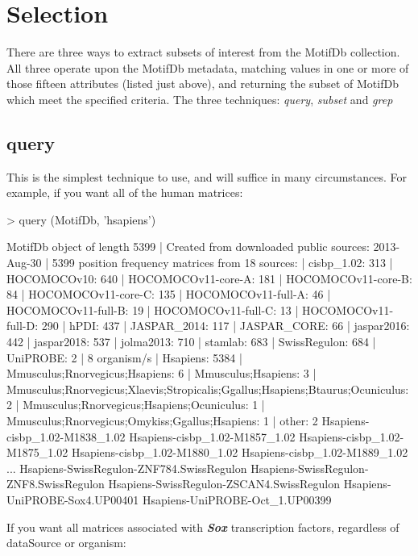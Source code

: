 \documentclass{article}
\renewenvironment{Schunk}{\vspace{\topsep}}{\vspace{\topsep}}
\begin{document}
\section{Selection}

There are three ways to extract subsets of interest from the MotifDb collection.  All three operate upon the MotifDb metadata,
matching values in one or more of those fifteen attributes (listed just above), and returning the subset of MotifDb  which
meet the specified criteria.  The three techniques:  \emph{query}, \emph{subset} and \emph{grep}

\subsection{query}
This is the simplest technique to use, and will suffice in many circumstances.  For example, if you want
all of the human matrices:
\begin{Schunk}
\begin{Sinput}
> query (MotifDb, 'hsapiens')
\end{Sinput}
\begin{Soutput}
MotifDb object of length 5399
| Created from downloaded public sources: 2013-Aug-30
| 5399 position frequency matrices from 18 sources:
|         cisbp_1.02:  313
|        HOCOMOCOv10:  640
| HOCOMOCOv11-core-A:  181
| HOCOMOCOv11-core-B:   84
| HOCOMOCOv11-core-C:  135
| HOCOMOCOv11-full-A:   46
| HOCOMOCOv11-full-B:   19
| HOCOMOCOv11-full-C:   13
| HOCOMOCOv11-full-D:  290
|               hPDI:  437
|        JASPAR_2014:  117
|        JASPAR_CORE:   66
|         jaspar2016:  442
|         jaspar2018:  537
|          jolma2013:  710
|            stamlab:  683
|       SwissRegulon:  684
|           UniPROBE:    2
| 8 organism/s
|           Hsapiens: 5384
| Mmusculus;Rnorvegicus;Hsapiens:    6
| Mmusculus;Hsapiens:    3
| Mmusculus;Rnorvegicus;Xlaevis;Stropicalis;Ggallus;Hsapiens;Btaurus;Ocuniculus:    2
| Mmusculus;Rnorvegicus;Hsapiens;Ocuniculus:    1
| Mmusculus;Rnorvegicus;Omykiss;Ggallus;Hsapiens:    1
|              other:    2
Hsapiens-cisbp_1.02-M1838_1.02 
Hsapiens-cisbp_1.02-M1857_1.02 
Hsapiens-cisbp_1.02-M1875_1.02 
Hsapiens-cisbp_1.02-M1880_1.02 
Hsapiens-cisbp_1.02-M1889_1.02 
...
Hsapiens-SwissRegulon-ZNF784.SwissRegulon 
Hsapiens-SwissRegulon-ZNF8.SwissRegulon 
Hsapiens-SwissRegulon-ZSCAN4.SwissRegulon 
Hsapiens-UniPROBE-Sox4.UP00401 
Hsapiens-UniPROBE-Oct_1.UP00399 
\end{Soutput}
\end{Schunk}
If you want all matrices associated with \textbf{\emph{Sox}} transcription factors, regardless of dataSource or organism:
\end{document}
